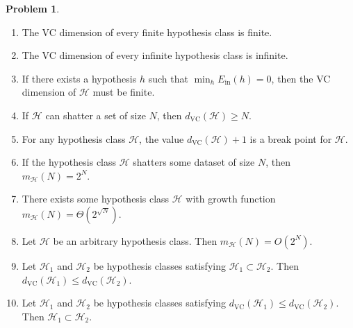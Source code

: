 \documentclass[10pt]{exam}
\theoremstyle{definition}
\newtheorem{problem}{Problem}
\newcommand{\Ein}{E_{\text{in}}}
\newcommand{\mH}{m_{\mathcal H}}
\newcommand{\dvc}{{d_{\text{VC}}}}
\begin{document}
\begin{problem}
\begin{enumerate}
        \item The VC dimension of every finite hypothesis class is finite.
            \vspace{3in}
        \item The VC dimension of every infinite hypothesis class is infinite.
            \vspace{3in}
        \item If there exists a hypothesis $h$ such that $\min_{h} \Ein(h) = 0$,
            then the VC dimension of $\mathcal H$ must be finite.
            \vspace{3in}
        \item
            If $\mathcal H$ can shatter a set of size $N$, then $\dvc(\mathcal H) \ge N$.
            \vspace{3in}
        \item
            For any hypothesis class $\mathcal H$, the value $\dvc(\mathcal H) + 1$ is a break point for $\mathcal H$.
            \vspace{3in}
        \item
            If the hypothesis class $\mathcal H$ shatters some dataset of size $N$, then $\mH(N) = 2^N$.
            \vspace{3in}
        \item
            There exists some hypothesis class $\mathcal H$ with growth function $\mH(N) = \Theta(2^{\sqrt{N}})$.
            \vspace{3in}
        \item
            Let $\mathcal H$ be an arbitrary hypothesis class.
            Then $\mH(N) = O(2^N)$.
            \vspace{3in}
        \item
            Let $\mathcal H_1$ and $\mathcal H_2$ be hypothesis classes satisfying $\mathcal H_1 \subset \mathcal H_2$.
            Then $\dvc(\mathcal H_1) \le \dvc(\mathcal H_2)$.
            \vspace{3in}
        \item
            Let $\mathcal H_1$ and $\mathcal H_2$ be hypothesis classes satisfying $\dvc(\mathcal H_1) \le \dvc(\mathcal H_2)$.
            Then $\mathcal H_1 \subset \mathcal H_2$.
            \vspace{3in}

\end{enumerate}
\end{problem}
\end{document}

